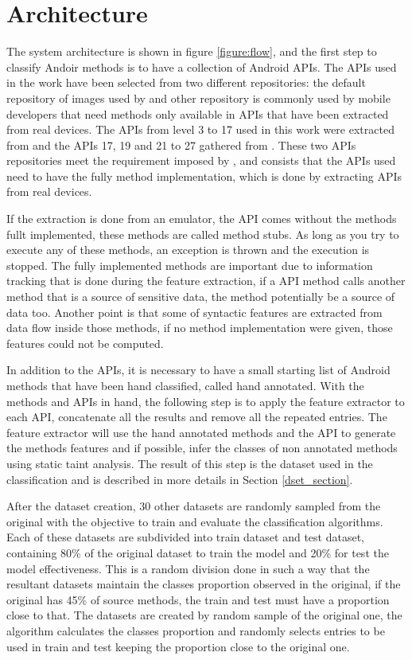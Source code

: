 \chapter{Architecture}

The system architecture is shown in figure \ref{figure:flow}, and the first step to classify Andoir methods is to have a collection of Android APIs. The APIs used in the work have been selected from two different repositories: the default repository of images used by \cite{rasthofer2014machine} and other repository is commonly used by mobile developers that need methods only available in APIs that have been extracted from real devices. The APIs from level 3 to 17 used in this work were extracted from \cite{rasthofer2014api} and the APIs 17, 19 and 21 to 27 gathered from \cite{hiddenapi}. These two APIs repositories meet the requirement imposed by \cite{rasthofer2014machine}, and consists that the APIs used need to have the fully method implementation, which is done by extracting APIs from real devices.

If the extraction is done from an emulator, the API comes without the methods fullt implemented, these methods are called method stubs. As long as you try to execute any of these methods, an exception is thrown and the execution is stopped. The fully implemented methods are important due to information tracking that is done during the feature extraction, if a API method calls another method that is a source of sensitive data, the method potentially be a source of data too. Another point is that some of syntactic features are extracted from data flow inside those methods, if no method implementation were given, those features could not be computed.

In addition to the APIs, it is necessary to have a small starting list of Android methods that have been hand classified, called hand annotated. With the methods and APIs in hand, the following step is to apply the feature extractor to each API, concatenate all the results and remove all the repeated entries. The feature extractor will use the hand annotated methods and the API to generate the methods features and if possible, infer the classes of non annotated methods using static taint analysis. The result of this step is the dataset used in the classification and is described in more details in Section \ref{dset_section}.

After the dataset creation, 30 other datasets are randomly sampled from the original with the objective to train and evaluate the classification algorithms. Each of these datasets are subdivided into train dataset and test dataset, containing 80\% of the original dataset to train the model and 20\% for test the model effectiveness. This is a random division done in such a way that the resultant datasets maintain the classes proportion observed in the original, if the original has 45\% of source methods, the train and test must have a proportion close to that. The datasets are created by random sample of the original one, the algorithm calculates the classes proportion and randomly selects entries to be used in train and test keeping the proportion close to the original one.

